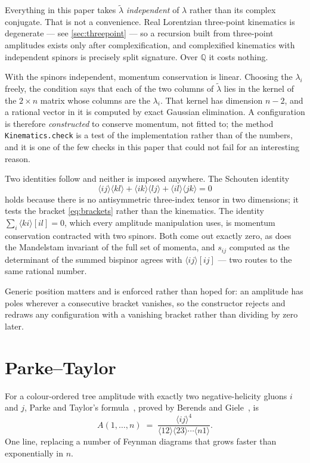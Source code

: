 \documentclass[11pt,a4paper]{article}
\newcommand{\QQ}{\mathbb{Q}}
\newcommand{\ket}[1]{\langle #1 \rangle}
\theoremstyle{definition}
\begin{document}
Everything in this paper takes $\tilde\lambda$ \emph{independent} of
$\lambda$ rather than its complex conjugate. That is not a convenience. Real
Lorentzian three-point kinematics is degenerate --- see
\cref{sec:threepoint} --- so a recursion built from three-point amplitudes
exists only after complexification, and complexified kinematics with
independent spinors is precisely split signature. Over $\QQ$ it costs
nothing.

With the spinors independent, momentum conservation is linear. Choosing the
$\lambda_i$ freely, the condition says that each of the two columns of
$\tilde\lambda$ lies in the kernel of the $2 \times n$ matrix whose columns
are the $\lambda_i$. That kernel has dimension $n - 2$, and a rational vector
in it is computed by exact Gaussian elimination. A configuration is therefore
\emph{constructed} to conserve momentum, not fitted to; the method
\texttt{Kinematics.check} is a test of the implementation rather than of the
numbers, and it is one of the few checks in this paper that could not fail
for an interesting reason.

Two identities follow and neither is imposed anywhere. The Schouten identity
%
\begin{equation}
\ket{ij}\ket{kl} + \ket{ik}\ket{lj} + \ket{il}\ket{jk} = 0
\label{eq:schouten}
\end{equation}
%
holds because there is no antisymmetric three-index tensor in two dimensions;
it tests the bracket \cref{eq:brackets} rather than the kinematics. The
identity $\sum_i \ket{ki}[il] = 0$, which every amplitude manipulation uses,
is momentum conservation contracted with two spinors. Both come out exactly
zero, as does the Mandelstam invariant of the full set of momenta, and
$s_{ij}$ computed as the determinant of the summed bispinor agrees with
$\ket{ij}[ij]$ --- two routes to the same rational number.

Generic position matters and is enforced rather than hoped for: an amplitude
has poles wherever a consecutive bracket vanishes, so the constructor rejects
and redraws any configuration with a vanishing bracket rather than dividing by
zero later.


\section{Parke--Taylor}
\label{sec:pt}

For a colour-ordered tree amplitude with exactly two negative-helicity gluons
$i$ and $j$, Parke and Taylor's formula~\cite{ParkeTaylor1986}, proved by
Berends and Giele~\cite{BerendsGiele1988}, is
%
\begin{equation}
A(1, \dots, n) \;=\;
\frac{\ket{ij}^4}{\ket{12}\ket{23}\cdots\ket{n1}} .
\label{eq:pt}
\end{equation}
%
One line, replacing a number of Feynman diagrams that grows faster than
exponentially in $n$.
\end{document}
